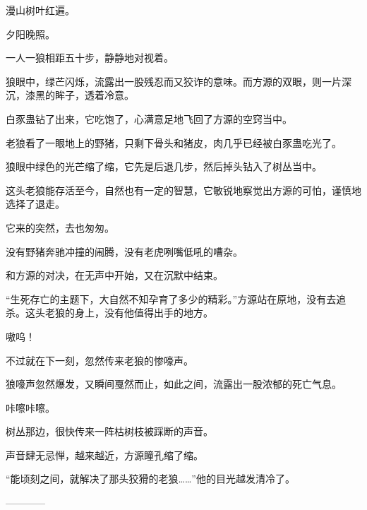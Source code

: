 \begin{this_body}
漫山树叶红遍。

夕阳晚照。

一人一狼相距五十步，静静地对视着。

狼眼中，绿芒闪烁，流露出一股残忍而又狡诈的意味。而方源的双眼，则一片深沉，漆黑的眸子，透着冷意。

白豕蛊钻了出来，它吃饱了，心满意足地飞回了方源的空窍当中。

老狼看了一眼地上的野猪，只剩下骨头和猪皮，肉几乎已经被白豕蛊吃光了。

狼眼中绿色的光芒缩了缩，它先是后退几步，然后掉头钻入了树丛当中。

这头老狼能存活至今，自然也有一定的智慧，它敏锐地察觉出方源的可怕，谨慎地选择了退走。

它来的突然，去也匆匆。

没有野猪奔驰冲撞的闹腾，没有老虎咧嘴低吼的嘈杂。

和方源的对决，在无声中开始，又在沉默中结束。

“生死存亡的主题下，大自然不知孕育了多少的精彩。”方源站在原地，没有去追杀。这头老狼的身上，没有他值得出手的地方。

嗷呜！

不过就在下一刻，忽然传来老狼的惨嚎声。

狼嚎声忽然爆发，又瞬间戛然而止，如此之间，流露出一股浓郁的死亡气息。

咔嚓咔嚓。

树丛那边，很快传来一阵枯树枝被踩断的声音。

声音肆无忌惮，越来越近，方源瞳孔缩了缩。

“能顷刻之间，就解决了那头狡猾的老狼……”他的目光越发清冷了。

------------

\end{this_body}


